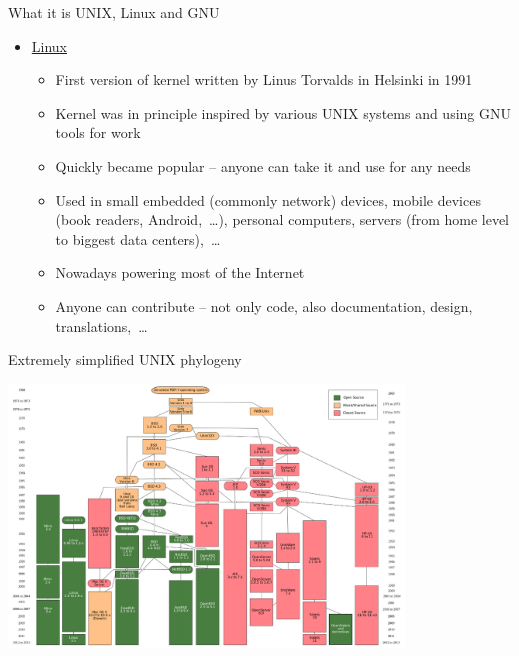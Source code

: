 \documentclass[compress, ucs, xelatex, 11pt, xcolor=svgnames,
  hyperref={
    bookmarks=true,
    unicode=true,
    colorlinks=true,
    pdftitle={Linux, command line and MetaCentrum},
    plainpages=false,
    pdfauthor={Vojtech Zeisek},
    pdfsubject={Course about use of Linux command line, writing shell scripts and using MetaCentrum of CESNET},
    pdfcreator={XeLaTeX},
    pdfkeywords={Linux, GNU, BASH, shell, command line, MetaCentrum},
    linkcolor=DarkRed,
    anchorcolor=DarkBlue,
    citecolor=Indigo,
    filecolor=NavyBlue,
    menucolor=DarkMagenta,
    urlcolor=DarkBlue,
    pdftex},
  url={hyphens, lowtilde} %
  ]{beamer}
\begin{document}
\begin{frame}[allowframebreaks]{What it is UNIX, Linux and GNU}
\begin{itemize}
\begin{itemize}
      \item Generally set of basic system tools -- working with many kernels (Linux BSD*, Mac's Darwin,~\ldots), also present in many commercial paid UNIX systems
      \item Source code is free -- anyone can study it (Security!), report bugs, contribute, modify, share it,~\ldots
      \item GNU General Public License (GPL) -- free spirit of open-source -- license, idea, how to share software
    \end{itemize}
    \item \href{https://en.wikipedia.org/wiki/Linux}{Linux}
    \begin{itemize}
      \item First version of kernel written by Linus Torvalds in Helsinki in 1991
      \item Kernel was in principle inspired by various UNIX systems and using GNU tools for work
      \item Quickly became popular -- anyone can take it and use for any needs
      \item Used in small embedded (commonly network) devices, mobile devices (book readers, Android,~\ldots), personal computers, servers (from home level to biggest data centers),~\ldots
      \item Nowadays powering most of the Internet
      \item Anyone can contribute -- not only code, also documentation, design, translations,~\ldots
    \end{itemize}
  \end{itemize}
\end{frame}

\begin{frame}{Extremely simplified UNIX phylogeny}
  \begin{center}
    \includegraphics[height=7cm]{unix_history-simple.png}
  \end{center}
\end{frame}
\end{document}

